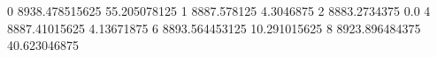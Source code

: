 0 8938.478515625 55.205078125
1 8887.578125 4.3046875
2 8883.2734375 0.0
4 8887.41015625 4.13671875
6 8893.564453125 10.291015625
8 8923.896484375 40.623046875

